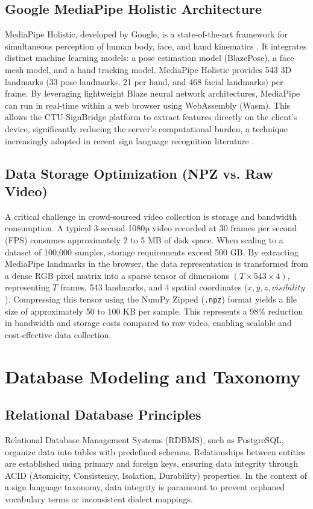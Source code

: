 \subsection{Google MediaPipe Holistic Architecture}
MediaPipe Holistic, developed by Google, is a state-of-the-art framework for simultaneous perception of human body, face, and hand kinematics \cite{lugaresi2019mediapipe}. It integrates distinct machine learning models: a pose estimation model (BlazePose), a face mesh model, and a hand tracking model. 
MediaPipe Holistic provides 543 3D landmarks (33 pose landmarks, 21 per hand, and 468 facial landmarks) per frame. By leveraging lightweight Blaze neural network architectures, MediaPipe can run in real-time within a web browser using WebAssembly (Wasm). This allows the CTU-SignBridge platform to extract features directly on the client's device, significantly reducing the server's computational burden, a technique increasingly adopted in recent sign language recognition literature \cite{gomez2024sign, sharma2024continuous, wijaya2023dynamic}.

\subsection{Data Storage Optimization (NPZ vs. Raw Video)}
A critical challenge in crowd-sourced video collection is storage and bandwidth consumption. A typical 3-second 1080p video recorded at 30 frames per second (FPS) consumes approximately 2 to 5 MB of disk space. When scaling to a dataset of 100,000 samples, storage requirements exceed 500 GB.
By extracting MediaPipe landmarks in the browser, the data representation is transformed from a dense RGB pixel matrix into a sparse tensor of dimensions $(T \times 543 \times 4)$, representing $T$ frames, 543 landmarks, and 4 spatial coordinates ($x, y, z, visibility$). Compressing this tensor using the NumPy Zipped (\texttt{.npz}) format yields a file size of approximately 50 to 100 KB per sample. This represents a 98\% reduction in bandwidth and storage costs compared to raw video, enabling scalable and cost-effective data collection.

\section{Database Modeling and Taxonomy}
\subsection{Relational Database Principles}
Relational Database Management Systems (RDBMS), such as PostgreSQL, organize data into tables with predefined schemas. Relationships between entities are established using primary and foreign keys, ensuring data integrity through ACID (Atomicity, Consistency, Isolation, Durability) properties. In the context of a sign language taxonomy, data integrity is paramount to prevent orphaned vocabulary terms or inconsistent dialect mappings.


